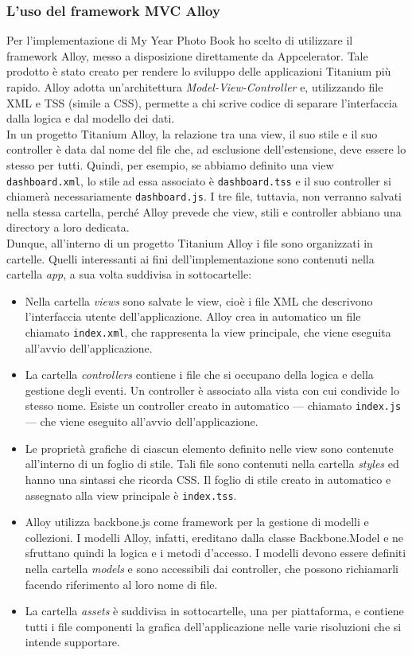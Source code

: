 			\subsubsection{L'uso del framework MVC Alloy}
				Per l'implementazione di My Year Photo Book ho scelto di utilizzare il framework Alloy, messo a disposizione
				direttamente da Appcelerator. Tale prodotto è stato creato per rendere lo sviluppo delle applicazioni Titanium più
				rapido. Alloy adotta un’architettura \emph{Model-View-Controller} e, utilizzando file XML e TSS (simile a CSS),
				permette a chi scrive codice di separare l'interfaccia dalla logica e dal modello dei dati.\\
				In un progetto Titanium Alloy, la relazione tra una view, il suo stile e il suo controller è data dal nome del file
				che, ad esclusione dell'estensione, deve essere lo stesso per tutti. Quindi, per esempio, se abbiamo definito una
				view \texttt{dashboard.xml}, lo stile ad essa associato è \texttt{dashboard.tss} e il suo controller si chiamerà
				necessariamente \texttt{dashboard.js}. I tre file, tuttavia, non verranno salvati nella stessa cartella, perché
				Alloy prevede che view, stili e controller abbiano una directory a loro dedicata.\\
				Dunque, all'interno di un progetto Titanium Alloy i file sono organizzati in cartelle. Quelli interessanti ai fini
				dell'implementazione sono contenuti nella cartella \emph{app}, a sua volta suddivisa in sottocartelle:
				\begin{itemize}
					\item Nella cartella \emph{views} sono salvate le view, cioè i file XML che descrivono l'interfaccia utente
					dell'applicazione. Alloy crea in automatico un file chiamato \texttt{index.xml}, che rappresenta la view
					principale, che viene eseguita all'avvio dell'applicazione.
					\item La cartella \emph{controllers} contiene i file che si occupano della logica e della gestione degli
					eventi. Un controller è associato alla vista con cui condivide lo stesso nome. Esiste un controller
					creato in automatico — chiamato \texttt{index.js} — che viene eseguito all'avvio dell'applicazione.
					\item Le proprietà grafiche di ciascun elemento definito nelle view sono contenute all'interno di un foglio
					di stile. Tali file sono contenuti nella cartella \emph{styles} ed hanno una sintassi che ricorda
					CSS. Il foglio di stile creato in automatico e assegnato alla view principale è \texttt{index.tss}.
					\item Alloy utilizza backbone.js come framework per la gestione di modelli e collezioni. I modelli
					Alloy, infatti, ereditano dalla classe Backbone.Model e ne sfruttano quindi la logica e i metodi d'accesso.
					I modelli devono essere definiti nella cartella \emph{models} e sono accessibili dai controller, che possono
					richiamarli facendo riferimento al loro nome di file.
					\item La cartella \emph{assets} è suddivisa in sottocartelle, una per piattaforma, e contiene
					tutti i file componenti la grafica dell'applicazione nelle varie risoluzioni che si intende supportare.
				\end{itemize}
